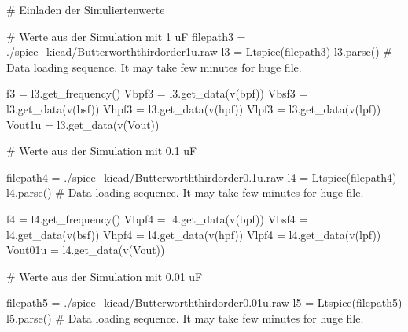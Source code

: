 \documentclass[
  ngerman,
  letterpaper,
  DIV=11]{scrreprt}
\newenvironment{Shaded}{}{}
\newcommand{\CommentTok}[1]{\textcolor[rgb]{0.42,0.45,0.49}{#1}}
\newcommand{\NormalTok}[1]{\textcolor[rgb]{0.14,0.16,0.18}{#1}}
\newcommand{\OperatorTok}[1]{\textcolor[rgb]{0.14,0.16,0.18}{#1}}
\newcommand{\StringTok}[1]{\textcolor[rgb]{0.01,0.18,0.38}{#1}}
\begin{document}
\begin{Shaded}
\begin{Highlighting}[]
\CommentTok{\# Einladen der Simuliertenwerte}

\CommentTok{\# Werte aus der Simulation mit 1 uF  }
\NormalTok{filepath3 }\OperatorTok{=} \StringTok{\textquotesingle{}./spice\_kicad/Butterworththirdorder1u.raw\textquotesingle{}}
\NormalTok{l3 }\OperatorTok{=}\NormalTok{ Ltspice(filepath3)}
\NormalTok{l3.parse() }\CommentTok{\# Data loading sequence. It may take few minutes for huge file.}

\NormalTok{f3 }\OperatorTok{=}\NormalTok{ l3.get\_frequency()}
\NormalTok{Vbpf3 }\OperatorTok{=}\NormalTok{ l3.get\_data(}\StringTok{\textquotesingle{}v(bpf)\textquotesingle{}}\NormalTok{)}
\NormalTok{Vbsf3 }\OperatorTok{=}\NormalTok{ l3.get\_data(}\StringTok{\textquotesingle{}v(bsf)\textquotesingle{}}\NormalTok{)}
\NormalTok{Vhpf3 }\OperatorTok{=}\NormalTok{ l3.get\_data(}\StringTok{\textquotesingle{}v(hpf)\textquotesingle{}}\NormalTok{)}
\NormalTok{Vlpf3 }\OperatorTok{=}\NormalTok{ l3.get\_data(}\StringTok{\textquotesingle{}v(lpf)\textquotesingle{}}\NormalTok{)}
\NormalTok{Vout1u  }\OperatorTok{=}\NormalTok{ l3.get\_data(}\StringTok{\textquotesingle{}v(Vout)\textquotesingle{}}\NormalTok{) }

\CommentTok{\# Werte aus der Simulation mit 0.1 uF}

\NormalTok{filepath4 }\OperatorTok{=} \StringTok{\textquotesingle{}./spice\_kicad/Butterworththirdorder0.1u.raw\textquotesingle{}}
\NormalTok{l4 }\OperatorTok{=}\NormalTok{ Ltspice(filepath4)}
\NormalTok{l4.parse() }\CommentTok{\# Data loading sequence. It may take few minutes for huge file.}

\NormalTok{f4 }\OperatorTok{=}\NormalTok{ l4.get\_frequency()}
\NormalTok{Vbpf4 }\OperatorTok{=}\NormalTok{ l4.get\_data(}\StringTok{\textquotesingle{}v(bpf)\textquotesingle{}}\NormalTok{)}
\NormalTok{Vbsf4 }\OperatorTok{=}\NormalTok{ l4.get\_data(}\StringTok{\textquotesingle{}v(bsf)\textquotesingle{}}\NormalTok{)}
\NormalTok{Vhpf4 }\OperatorTok{=}\NormalTok{ l4.get\_data(}\StringTok{\textquotesingle{}v(hpf)\textquotesingle{}}\NormalTok{)}
\NormalTok{Vlpf4 }\OperatorTok{=}\NormalTok{ l4.get\_data(}\StringTok{\textquotesingle{}v(lpf)\textquotesingle{}}\NormalTok{)}
\NormalTok{Vout01u  }\OperatorTok{=}\NormalTok{ l4.get\_data(}\StringTok{\textquotesingle{}v(Vout)\textquotesingle{}}\NormalTok{) }

\CommentTok{\# Werte aus der Simulation mit 0.01 uF}

\NormalTok{filepath5 }\OperatorTok{=} \StringTok{\textquotesingle{}./spice\_kicad/Butterworththirdorder0.01u.raw\textquotesingle{}}
\NormalTok{l5 }\OperatorTok{=}\NormalTok{ Ltspice(filepath5)}
\NormalTok{l5.parse() }\CommentTok{\# Data loading sequence. It may take few minutes for huge file.}


\end{Highlighting}
\end{Shaded}
\end{document}
